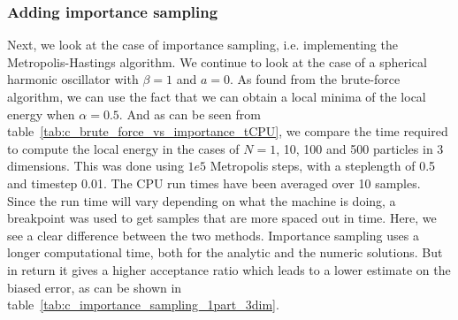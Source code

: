 \documentclass[
    a4paper, aps, twocolumn, floatfix, superscriptaddress,
    nofootinbib]{revtex4-1}
\begin{document}
\subsubsection{Adding importance sampling}
Next, we look at the case of importance sampling, i.e. implementing the Metropolis-Hastings algorithm. We continue to look at the case of a spherical harmonic oscillator with $\beta=1$ and $a=0$. As found from the brute-force algorithm, we can use the fact that we can obtain a local minima of the local energy when $\alpha = 0.5$. And as can be seen from table~\ref{tab:c_brute_force_vs_importance_tCPU}, we compare the time required to compute the local energy in the cases of $N=1$, 10, 100 and 500 particles in 3 dimensions. This was done using $1e5$ Metropolis steps, with a steplength of 0.5 and timestep 0.01. The CPU run times have been averaged over 10 samples. Since the run time will vary depending on what the machine is doing, a breakpoint was used to get samples that are more spaced out in time. Here, we see a clear difference between the two methods. Importance sampling uses a longer computational time, both for the analytic and the numeric solutions. But in return it gives a higher acceptance ratio which leads to a lower estimate on the biased error, as can be shown in table~\ref{tab:c_importance_sampling_1part_3dim}. 
\end{document}
